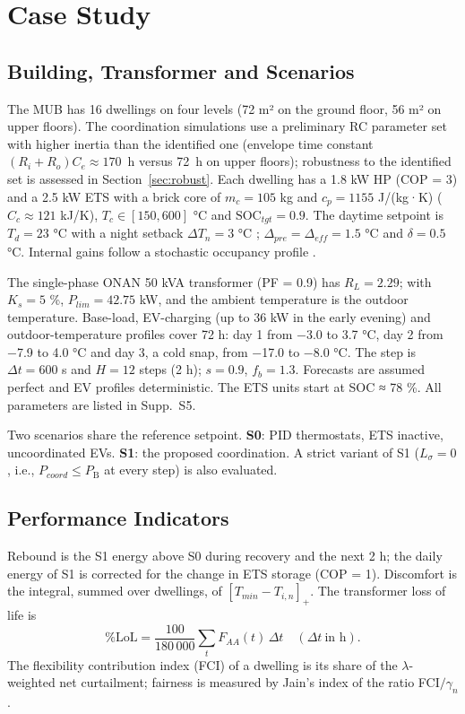 \documentclass[conference]{IEEEtran}
\newcommand{\PB}{P_{\mathrm{B}}}          %
\newcommand{\Supp}[1]{Supp.~S#1}          %
\begin{document}
\section{Case Study}\label{sec:case}

\subsection{Building, Transformer and Scenarios}
The MUB has 16 dwellings on four levels (72 m² on the ground floor, 56 m² on upper floors). The coordination simulations use a preliminary RC parameter set with higher inertia than the identified one (envelope time constant $(R_i+R_o)C_e\approx170$~h versus 72~h on upper floors); robustness to the identified set is assessed in Section~\ref{sec:robust}. Each dwelling has a 1.8 kW HP (COP = 3) and a 2.5 kW ETS with a brick core of $m_c=105$ kg and $c_p=1155$ J/(kg·K) ($C_c\approx121$ kJ/K), $T_c\in[150,600]$ °C and $\mathrm{SOC}_{tgt}=0.9$. The daytime setpoint is $T_d=23$ °C with a night setback $\Delta T_n=3$ °C \cite{RNCan2024}; $\Delta_{pre}=\Delta_{eff}=1.5$ °C and $\delta=0.5$ °C. Internal gains follow a stochastic occupancy profile \cite{Richardson2008}.

The single-phase ONAN 50 kVA transformer (PF = 0.9) has $R_L=2.29$; with $K_s=5$ \%, $P_{lim}=42.75$ kW, and the ambient temperature is the outdoor temperature. Base-load, EV-charging (up to 36 kW in the early evening) and outdoor-temperature profiles cover 72 h: day 1 from −3.0 to 3.7 °C, day 2 from −7.9 to 4.0 °C and day 3, a cold snap, from −17.0 to −8.0 °C. The step is $\Delta t=600$ s and $H=12$ steps (2 h); $s=0.9$, $f_b=1.3$. Forecasts are assumed perfect and EV profiles deterministic. The ETS units start at SOC ≈ 78 \%. All parameters are listed in \Supp{5}.

Two scenarios share the reference setpoint. \textbf{S0}: PID thermostats, ETS inactive, uncoordinated EVs. \textbf{S1}: the proposed coordination. A strict variant of S1 ($L_\sigma=0$, i.e., $P_{coord}\le\PB$ at every step) is also evaluated.

\subsection{Performance Indicators}
Rebound is the S1 energy above S0 during recovery and the next 2 h; the daily energy of S1 is corrected for the change in ETS storage (COP = 1). Discomfort is the integral, summed over dwellings, of $[T_{min}-T_{i,n}]_+$. The transformer loss of life is
\begin{equation}\label{eq:lol}
\%\mathrm{LoL}=\frac{100}{180\,000}\sum_tF_{AA}(t)\,\Delta t\quad(\Delta t\ \text{in h}).
\end{equation}
The flexibility contribution index (FCI) of a dwelling is its share of the $\lambda$-weighted net curtailment; fairness is measured by Jain's index \cite{Jain1984} of the ratio FCI$/\gamma_n$.
\end{document}
